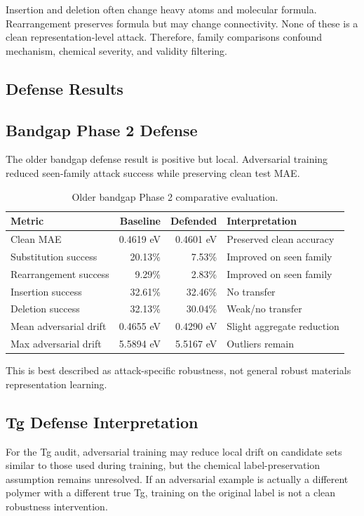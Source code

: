 \documentclass[11pt]{article}
\begin{document}
Insertion and deletion often change heavy atoms and molecular formula.
Rearrangement preserves formula but may change connectivity. None of these is a
clean representation-level attack. Therefore, family comparisons confound
mechanism, chemical severity, and validity filtering.

\subsection{Defense Results}

\subsection{Bandgap Phase 2 Defense}

The older bandgap defense result is positive but local. Adversarial training
reduced seen-family attack success while preserving clean test MAE.

\begin{table}[H]
\centering
\caption{Older bandgap Phase 2 comparative evaluation.}
\begin{tabular}{@{}lrrl@{}}
\toprule
Metric & Baseline & Defended & Interpretation \\
\midrule
Clean MAE & 0.4619 eV & 0.4601 eV & Preserved clean accuracy \\
Substitution success & 20.13\% & 7.53\% & Improved on seen family \\
Rearrangement success & 9.29\% & 2.83\% & Improved on seen family \\
Insertion success & 32.61\% & 32.46\% & No transfer \\
Deletion success & 32.13\% & 30.04\% & Weak/no transfer \\
Mean adversarial drift & 0.4655 eV & 0.4290 eV & Slight aggregate reduction \\
Max adversarial drift & 5.5894 eV & 5.5167 eV & Outliers remain \\
\bottomrule
\end{tabular}
\end{table}

This is best described as attack-specific robustness, not general robust
materials representation learning.

\subsection{Tg Defense Interpretation}

For the Tg audit, adversarial training may reduce local drift on candidate sets
similar to those used during training, but the chemical label-preservation
assumption remains unresolved. If an adversarial example is actually a different
polymer with a different true Tg, training on the original label is not a clean
robustness intervention.
\end{document}
